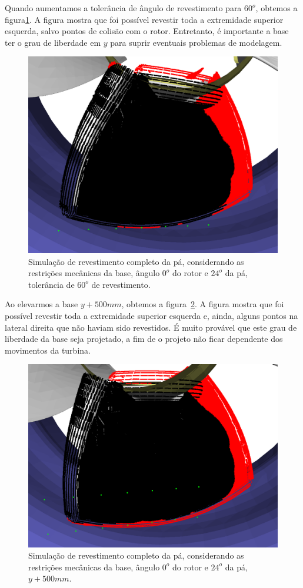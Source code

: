 Quando aumentamos a tolerância de ângulo de revestimento
para $60^o$, obtemos a figura\ref{fig::simcomp1_3}. A figura mostra que foi
possível revestir toda a extremidade superior esquerda, salvo pontos de colisão
com o rotor. Entretanto, é importante a base ter o grau de liberdade em $y$ para
suprir eventuais problemas de modelagem.

\begin{figure}[!ht]
	\centering	
	\includegraphics[width=.5\columnwidth]{figs/simcomp1_3.png}
	\caption{Simulação de revestimento completo da pá, considerando as
	restrições mecânicas da base, ângulo $0^o$ do rotor e $24^o$ da pá,
	tolerância de $60^o$ de revestimento.}
	\label{fig::simcomp1_3}
\end{figure}

Ao elevarmos a base $y+500 mm$, obtemos a figura~\ref{fig::simcomp1_6}. A figura
mostra que foi possível revestir toda a extremidade superior esquerda e, ainda,
alguns pontos na lateral direita que não haviam sido revestidos. É muito
provável que este grau de liberdade da base seja projetado, a fim de o projeto
não ficar dependente dos movimentos da turbina.

\begin{figure}[!ht]
	\centering	
	\includegraphics[width=.5\columnwidth]{figs/simcomp1_6.png}
	\caption{Simulação de revestimento completo da pá, considerando as
	restrições mecânicas da base, ângulo $0^o$ do rotor e $24^o$ da pá,
	$y+500 mm$.}
	\label{fig::simcomp1_6}
\end{figure}

